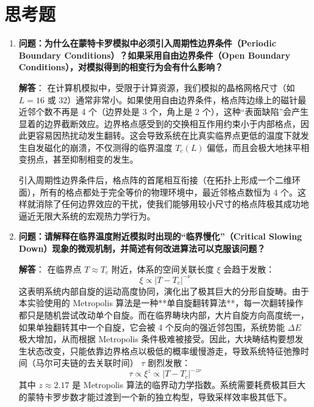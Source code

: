 \documentclass[11pt]{article}
\begin{document}
\section{思考题}

\begin{enumerate}
    \item \textbf{问题：为什么在蒙特卡罗模拟中必须引入周期性边界条件（Periodic Boundary Conditions）？如果采用自由边界条件（Open Boundary Conditions），对模拟得到的相变行为会有什么影响？}
    
    \textbf{解答}：
    在计算机模拟中，受限于计算资源，我们模拟的晶格网格尺寸（如 $L=16$ 或 $32$）通常非常小。如果使用自由边界条件，格点阵边缘上的磁针最近邻个数不再是 4 个（边界处是 3 个，角上是 2 个），这种“表面缺陷”会产生显着的边界截断效应。边界格点感受到的交换相互作用约束小于内部格点，因此更容易因热扰动发生翻转。这会导致系统在比真实临界点更低的温度下就发生自发磁化的崩溃，不仅测得的临界温度 $T_c(L)$ 偏低，而且会极大地抹平相变拐点，甚至抑制相变的发生。
    
    引入周期性边界条件后，格点阵的首尾相互衔接（在拓扑上形成一个二维环面），所有的格点都处于完全等价的物理环境中，最近邻格点数恒为 4 个。这样就消除了任何边界效应的干扰，使我们能够用较小尺寸的格点阵极其成功地逼近无限大系统的宏观热力学行为。

    \item \textbf{问题：请解释在临界温度附近模拟时出现的“临界慢化”（Critical Slowing Down）现象的微观机制，并简述有何改进算法可以克服该问题？}
    
    \textbf{解答}：
    在临界点 $T \approx T_c$ 附近，体系的空间关联长度 $\xi$ 会趋于发散：
    \begin{equation}
        \xi \propto |T - T_c|^{-\nu}
    \end{equation}
    这表明系统内部自旋的运动高度协同，演化出了极其巨大的分形自旋畴。由于本实验使用的 Metropolis 算法是一种**单自旋翻转算法**，每一次翻转操作都只是随机尝试改动单个自旋。而在临界畴块内部，大片自旋方向高度统一，如果单独翻转其中一个自旋，它会被 4 个反向的强近邻包围，系统势能 $\Delta E$ 极大增加，从而根据 Metropolis 条件极难被接受。因此，大块畴结构要想发生状态改变，只能依靠边界格点以极低的概率缓慢游走，导致系统特征弛豫时间（马尔可夫链的去关联时间） $\tau$ 剧烈发散：
    \begin{equation}
        \tau \propto \xi^z \propto |T - T_c|^{-z\nu}
    \end{equation}
    其中 $z \approx 2.17$ 是 Metropolis 算法的临界动力学指数。系统需要耗费极其巨大的蒙特卡罗步数才能过渡到一个新的独立构型，导致采样效率极其低下。
    

\end{enumerate}
\end{document}
